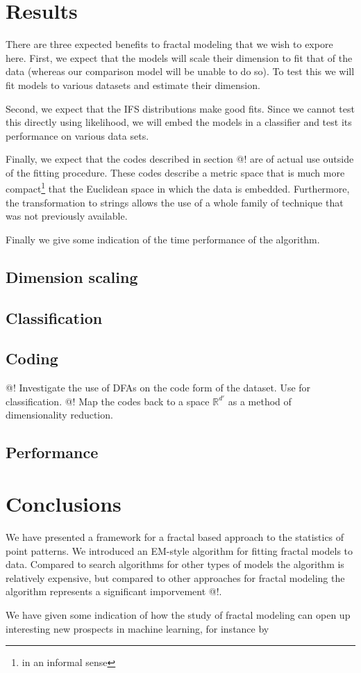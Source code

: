 \documentclass[11pt, twocolumn]{article}
\theoremstyle{definition}
\begin{document}
\section{Results}

There are three expected benefits to fractal modeling that we wish to expore here. First, we expect that the models will scale their dimension to fit that of the data (whereas our comparison model will be unable to do so). To test this we will fit models to various datasets and estimate their dimension. 

Second, we expect that the IFS distributions make good fits. Since we cannot test this directly using likelihood, we will embed the models in a classifier and test its performance on various data sets.

Finally, we expect that the codes described in section @! are of actual use outside of the fitting procedure. These codes describe a metric space that is much more compact\footnote{in an informal sense} that the Euclidean space in which the data is embedded. Furthermore, the transformation to strings allows the use of a whole family of technique that was not previously available.

Finally we give some indication of the time performance of the algorithm.

\subsection{Dimension scaling}

\subsection{Classification}

\subsection{Coding}

@! Investigate the use of DFAs on the code form of the dataset. Use for classification.
@! Map the codes back to a space ${\mathbb R}^{d'}$ as a method of dimensionality reduction. 

\subsection{Performance}

\section{Conclusions}

We have presented a framework for a fractal based approach to the statistics of point patterns. We introduced an EM-style algorithm for fitting fractal models to data. Compared to search algorithms for other types of models the algorithm is relatively expensive, but compared to other approaches for fractal modeling the algorithm represents a significant imporvement @!. 

We have given some indication of how the study of fractal modeling can open up interesting new prospects in machine learning, for instance by 
\end{document}
